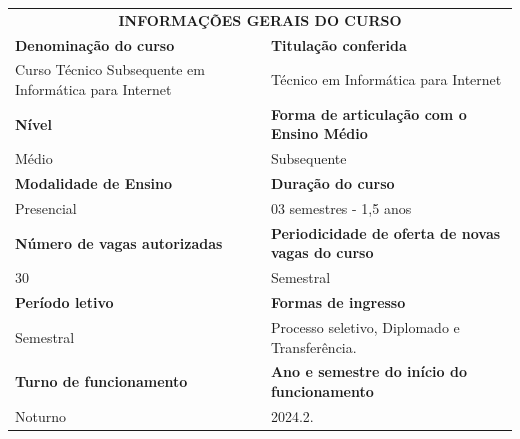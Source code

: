 \documentclass[
	12pt,				%
	openright,			%
	twoside,			%
	a4paper,			%
	chapter=TITLE,		%
	english,			%
	french,				%
	spanish,			%
	brazil,				%
	]{abntex2}
\begin{document}
\noindent
\begin{tabularx}{\linewidth}{X l}
	\multicolumn{2}{c}{\cellcolor{gray!40}\textbf{INFORMAÇÕES GERAIS DO CURSO}} \\
	
	\cellcolor{gray!10}\textbf{Denominação do curso} &
	\cellcolor{gray!10}\textbf{Titulação conferida} \\
	Curso Técnico Subsequente em \newline Informática para Internet &
	Técnico em Informática para Internet\\

	
	\cellcolor{gray!10}\textbf{Nível} &
	\cellcolor{gray!10}\textbf{Forma de articulação com o~ \newline Ensino Médio} \\	
	Médio & Subsequente\\
	
	 
	\cellcolor{gray!10}\textbf{Modalidade de Ensino} &
	\cellcolor{gray!10}\textbf{Duração do curso} \\
	Presencial & 03 semestres - 1,5 anos\\
	
	\cellcolor{gray!10}\textbf{Número de vagas autorizadas} &
	\cellcolor{gray!10}\textbf{Periodicidade de oferta de novas vagas do curso} \\
	30 & Semestral\\


	\cellcolor{gray!10}\textbf{Período letivo} &
	\cellcolor{gray!10}\textbf{Formas de ingresso} \\
	Semestral & Processo seletivo, Diplomado e Transferência.\\

	\cellcolor{gray!10}\textbf{Turno de funcionamento} &
	\cellcolor{gray!10}\textbf{Ano e semestre do início \newline do funcionamento} \\
	Noturno & 2024.2.\\	
\end{tabularx}
\end{document}
